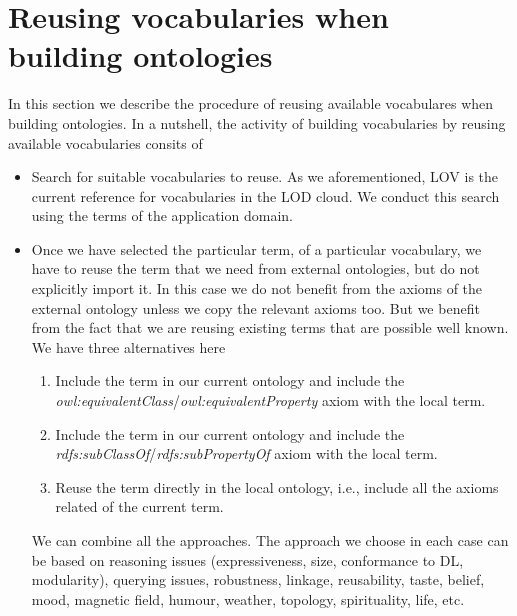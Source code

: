  
\section{Reusing vocabularies when building ontologies}
In this section we describe the procedure of reusing available vocabulares when building ontologies. In a nutshell, the activity of building vocabularies by reusing available vocabularies consits of
\begin{itemize}
	\item Search for suitable vocabularies to reuse. As we aforementioned, LOV is the current reference for vocabularies in the LOD cloud. We conduct this search using the terms of the application domain. 
	\item Once we have selected the particular term, of a particular vocabulary, we have to reuse the term that we need from external ontologies, but do not explicitly import it. In this case we do not benefit from the axioms of the external ontology unless we copy the relevant axioms too. But we benefit from the fact that we are reusing existing terms that are possible well known. We have three alternatives here
	\begin{enumerate}
		\item Include the term in our current ontology and include the \emph{owl:equivalentClass}/\emph{owl:equivalentProperty} axiom with the local term.
		\item Include the term in our current ontology and include the \emph{rdfs:subClassOf}/\emph{rdfs:subPropertyOf} axiom with the local term.
		\item Reuse the term directly in the local ontology, i.e., include all the axioms related of the current term.
	\end{enumerate}
		We can combine all the approaches. The approach we choose in each case can be based on reasoning issues (expressiveness, size, conformance to DL, modularity), querying issues, robustness, linkage, reusability, taste, belief, mood, magnetic field, humour, weather, topology, spirituality, life, etc.
\end{itemize}
